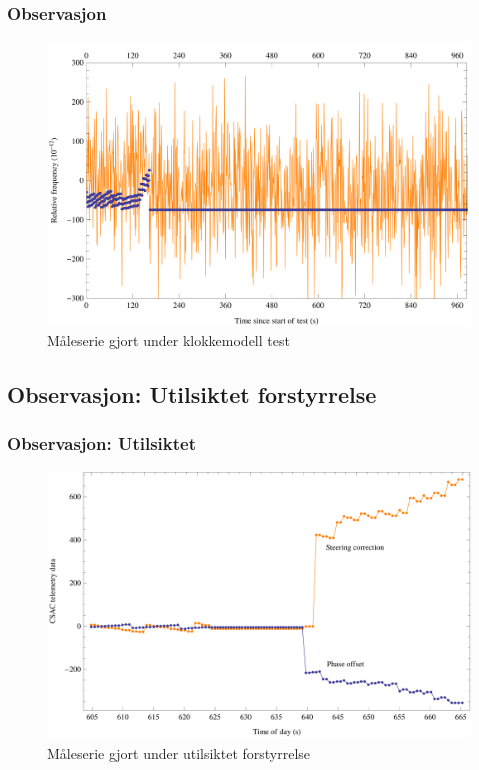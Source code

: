 \documentclass[xcolor=table]{beamer}
\begin{document}
\begin{frame}
\frametitle{Observasjon}
      \begin{figure}
        \includegraphics[scale=0.70]{thesis/graphics/20161024-test2-telemetry-and-cnt91-combined-1-2.png}
        \caption{Måleserie gjort under klokkemodell test}
      \end{figure}
\end{frame}

\begin{frame}
\section{Observasjon: Utilsiktet forstyrrelse}
\frametitle{Observasjon: Utilsiktet}
      \begin{figure}
        \includegraphics[scale=0.70]{thesis/graphics/disturbance57667-csac-telemetry-phase-steer-combined-zoom-in-2-1.png}
        \caption{Måleserie gjort under utilsiktet forstyrrelse}
      \end{figure}
\end{frame}
\end{document}
